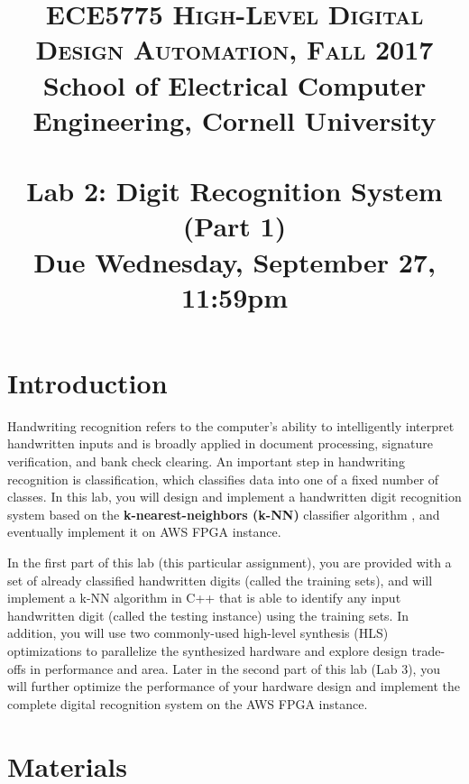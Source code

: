 \documentclass[paper=letter, fontsize=10pt]{scrartcl} %
\title{	
\normalfont \normalsize 
\textsc{ECE5775 High-Level Digital Design Automation, Fall 2017} \\  
School of Electrical Computer Engineering, Cornell University \\ [11pt]%
\horrule{0.5pt} \\[0.4cm] %
\large Lab 2: Digit Recognition System (Part 1) \\ %
\small Due Wednesday, September 27, 11:59pm
\horrule{0.5pt} \\[0.5cm] %
\vspace{-15ex}}
\date{}
\numberwithin{equation}{section} %
\numberwithin{figure}{section} %
\numberwithin{table}{section} %
\begin{document}
\maketitle %
\section{Introduction}

Handwriting recognition refers to the computer's ability to intelligently interpret handwritten inputs and is broadly applied in document processing, signature verification, and bank check clearing. An important step in handwriting recognition is classification, which classifies data into one of a fixed number of classes. In this lab, you will design and implement a handwritten digit recognition system based on the \textbf{k-nearest-neighbors (k-NN)} classifier algorithm \cite{knn}, and eventually implement it on AWS FPGA instance. 


In the first part of this lab (this particular assignment), you are provided with a set of already classified handwritten digits (called the training sets), and will implement a k-NN algorithm in C++ that is able to identify any input handwritten digit (called the testing instance) using the training sets. In addition, you will use two commonly-used high-level synthesis (HLS) optimizations to parallelize the synthesized hardware and explore design trade-offs in performance and area. Later in the second part of this lab (Lab 3), you will further optimize the performance of your hardware design and implement the complete digital recognition system on the AWS FPGA instance.


\section{Materials}
\label{materials}
\end{document}

